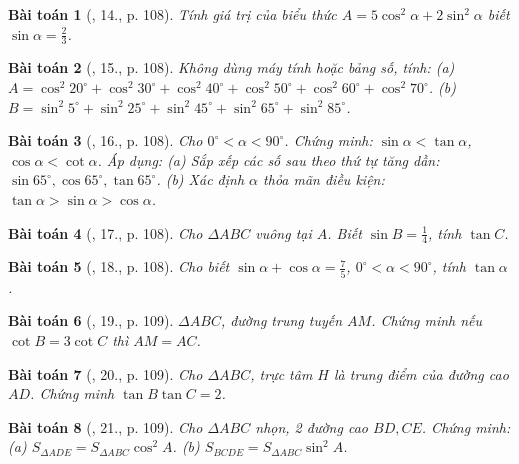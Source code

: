 \documentclass{article}
\newtheorem{baitoan}{Bài toán}
\begin{document}
\begin{baitoan}[\cite{Tuyen_Toan_9}, 14., p. 108]
	Tính giá trị của biểu thức $A = 5\cos^2\alpha + 2\sin^2\alpha$ biết $\sin\alpha = \frac{2}{3}$.
\end{baitoan}

\begin{baitoan}[\cite{Tuyen_Toan_9}, 15., p. 108]
	Không dùng máy tính hoặc bảng số, tính: (a) $A = \cos^2 20^\circ + \cos^2 30^\circ + \cos^2 40^\circ + \cos^2 50^\circ + \cos^2 60^\circ + \cos^2 70^\circ$. (b) $B = \sin^2 5^\circ + \sin^2 25^\circ + \sin^2 45^\circ + \sin^2 65^\circ + \sin^2 85^\circ$.
\end{baitoan}

\begin{baitoan}[\cite{Tuyen_Toan_9}, 16., p. 108]
	Cho $0^\circ < \alpha < 90^\circ$. Chứng minh: $\sin\alpha < \tan\alpha$, $\cos\alpha < \cot\alpha$. Áp dụng: (a) Sắp xếp các số sau theo thứ tự tăng dần: $\sin 65^\circ,\cos 65^\circ,\tan 65^\circ$. (b) Xác định $\alpha$ thỏa mãn điều kiện: $\tan\alpha > \sin\alpha > \cos\alpha$.
\end{baitoan}

\begin{baitoan}[\cite{Tuyen_Toan_9}, 17., p. 108]
	Cho $\Delta ABC$ vuông tại $A$. Biết $\sin B = \frac{1}{4}$, tính $\tan C$.
\end{baitoan}

\begin{baitoan}[\cite{Tuyen_Toan_9}, 18., p. 108]
	Cho biết $\sin\alpha + \cos\alpha = \frac{7}{5}$, $0^\circ < \alpha < 90^\circ$, tính $\tan\alpha$.
\end{baitoan}

\begin{baitoan}[\cite{Tuyen_Toan_9}, 19., p. 109]
	$\Delta ABC$, đường trung tuyến $AM$. Chứng minh nếu $\cot B = 3\cot C$ thì $AM = AC$.
\end{baitoan}

\begin{baitoan}[\cite{Tuyen_Toan_9}, 20., p. 109]
	Cho $\Delta ABC$, trực tâm $H$ là trung điểm của đường cao $AD$. Chứng minh $\tan B\tan C = 2$.
\end{baitoan}

\begin{baitoan}[\cite{Tuyen_Toan_9}, 21., p. 109]
	Cho $\Delta ABC$ nhọn, 2 đường cao $BD,CE$. Chứng minh: (a) $S_{\Delta ADE} = S_{\Delta ABC}\cos^2A$. (b) $S_{BCDE} = S_{\Delta ABC}\sin^2A$.
\end{baitoan}
\end{document}
